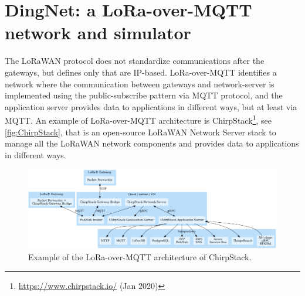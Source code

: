 \section{DingNet: a LoRa-over-MQTT network and simulator}
\label{sec:DingNet}
The LoRaWAN protocol does not standardize communications after the gateways, but defines only that are IP-based.
% 
LoRa-over-MQTT identifies a network where the communication between gateways and network-server is implemented using the public-subscribe pattern via MQTT protocol, and the application server provides data to applications in different ways, but at least via MQTT.
% 
An example of LoRa-over-MQTT architecture is ChirpStack\footnote{\href{https://www.chirpstack.io/}{https://www.chirpstack.io/} (Jan 2020)}, see \autoref{fig:ChirpStack}, that is an open-source LoRaWAN Network Server stack to manage all the LoRaWAN network components and provides data to applications in different ways.

\begin{figure}[h]
    \centering
    \includegraphics[width=\textwidth]{figures/chirpstack.png}
    \caption[LoRa-over-MQTT architecture]{Example of the LoRa-over-MQTT architecture of ChirpStack.~\cite{chirpstack2020}}
    \label{fig:ChirpStack}
\end{figure}

